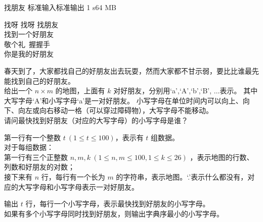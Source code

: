 \gdef\thisproblemauthor{SonaXiao}
\begin{problem}{找朋友}
{标准输入}{标准输出}
{1 s}{64 MB}{}

\begin{center}
找呀 找呀 找朋友\\
找到一个好朋友\\
敬个礼\ 握握手\\
你是我的好朋友
\end{center}

春天到了，大家都找自己的好朋友出去玩耍，然而大家都不甘示弱，要比比谁最先能找到自己的好朋友。\\
给出一个 $n\times m$ 的地图，上面有 $k$ 对好朋友，分别用`a',`A',`b',`B', $\ldots$表示。
其中大写字母`A'和小写字母`a'是一对好朋友。
小写字母在单位时间内可以向上、向下、向左或向右移动一格（可以穿过障碍物），大写字母不能移动。\\
请问最快找到好朋友（对应的大写字母）的小写字母是谁？

\InputFile

第一行有一个整数 $t\ (1 \le t \le 100)$，表示有 $t$ 组数据。\\
对于每组数据：\\
第一行有三个正整数 $n,m,k\ (1\le n,m\le 100,1\le k\le 26)$ ，表示地图的行数、列数和好朋友的对数；\\
接下来有 $n$ 行，每行有一个长为 $m$ 的字符串，表示地图。`.'表示什么都没有，对应的大写字母和小写字母表示一对好朋友。

\OutputFile

输出 $t$ 行，每行一个小写字母，表示最快找到好朋友的小写字母。\\
如果有多个小写字母同时找到好朋友，则输出字典序最小的小写字母。

\Example

\begin{example}
%
\end{example}

\end{problem}
